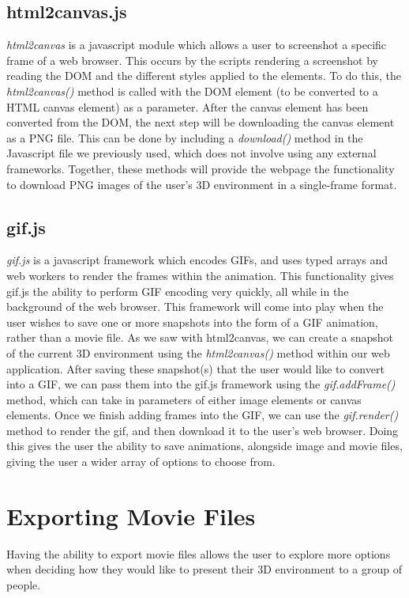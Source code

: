 \documentclass[letterpaper,10pt,titlepage, onecolumn, draftclsnofoot]{IEEEtran}
\begin{document}
\subsection{html2canvas.js}
\textit{html2canvas\cite{html2canvas}} is a javascript module which allows a user to screenshot a specific frame of a web browser. This occurs by the scripts rendering a screenshot by reading the DOM and the different styles applied to the elements. To do this, the \textit{html2canvas()} method is called with the DOM element (to be converted to a HTML canvas element) as a parameter. After the canvas element has been converted from the DOM, the next step will be downloading the canvas element as a PNG file. This can be done by including a \textit{download()} method in the Javascript file we previously used, which does not involve using any external frameworks\cite{frameworks}. Together, these methods will provide the webpage the functionality to download PNG images of the user’s 3D environment in a single-frame format. 

\subsection{gif.js}
\textit{gif.js\cite{gif.js}} is a javascript framework which encodes GIFs, and uses typed arrays and web workers to render the frames within the animation. This functionality gives gif.js the ability to perform GIF encoding very quickly, all while in the background of the web browser. This framework will come into play when the user wishes to save one or more snapshots into the form of a GIF animation, rather than a movie file. As we saw with html2canvas, we can create a snapshot of the current 3D environment using the \textit{html2canvas()} method within our web application. After saving these snapshot(s) that the user would like to convert into a GIF, we can pass them into the gif.js framework using the \textit{gif.addFrame()} method, which can take in parameters of either image elements or canvas elements. Once we finish adding frames into the GIF, we can use the \textit{gif.render()} method to render the gif, and then download it to the user’s web browser. Doing this gives the user the ability to save animations, alongside image and movie files, giving the user a wider array of options to choose from. 
\newline

\section{Exporting Movie Files}
Having the ability to export movie files allows the user to explore more options when deciding how they would like to present their 3D environment to a group of people. 
\end{document}
